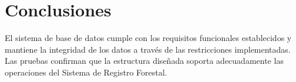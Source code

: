 \section{Conclusiones}
El sistema de base de datos cumple con los requisitos funcionales establecidos y mantiene la integridad de los datos a través de las restricciones implementadas. Las pruebas confirman que la estructura diseñada soporta adecuadamente las operaciones del Sistema de Registro Forestal.
